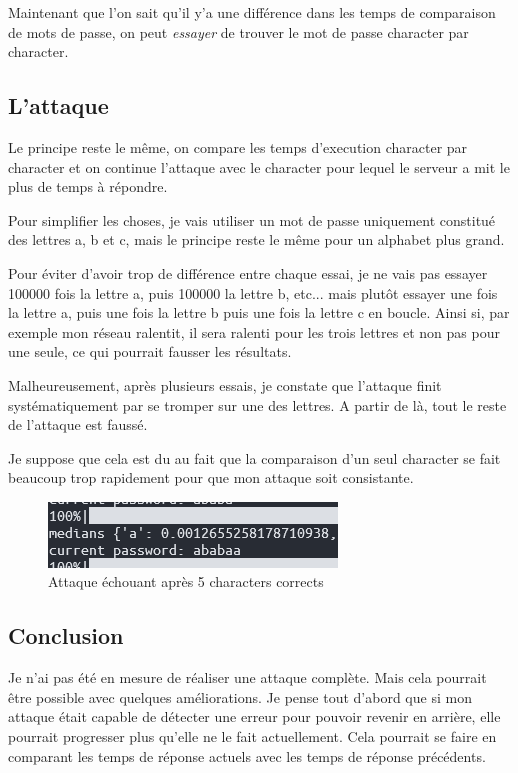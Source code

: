 \documentclass{article}
\begin{document}
Maintenant que l'on sait qu'il y'a une différence dans les temps de comparaison de mots de passe, on peut \emph{essayer} de trouver le mot de passe character par character.

\subsection*{L'attaque}

Le principe reste le même, on compare les temps d'execution character par character et on continue l'attaque avec le character pour lequel le serveur a mit le plus de temps à répondre.

Pour simplifier les choses, je vais utiliser un mot de passe uniquement constitué des lettres a, b et c, mais le principe reste le même pour un alphabet plus grand.

Pour éviter d'avoir trop de différence entre chaque essai, je ne vais pas essayer 100000 fois la lettre a, puis 100000 la lettre b, etc... mais plutôt essayer une fois la lettre a, puis une fois la lettre b puis une fois la lettre c en boucle. Ainsi si, par exemple mon réseau ralentit, il sera ralenti pour les trois lettres et non pas pour une seule, ce qui pourrait fausser les résultats.

Malheureusement, après plusieurs essais, je constate que l'attaque finit systématiquement par se tromper sur une des lettres. A partir de là, tout le reste de l'attaque est faussé.

Je suppose que cela est du au fait que la comparaison d'un seul character se fait beaucoup trop rapidement pour que mon attaque soit consistante.

\begin{figure}
    \caption{Attaque échouant après 5 characters corrects}
    \includegraphics{echec.png}
\end{figure}

\subsection*{Conclusion}

Je n'ai pas été en mesure de réaliser une attaque complète. Mais cela pourrait être possible avec quelques améliorations.
Je pense tout d'abord que si mon attaque était capable de détecter une erreur pour pouvoir revenir en arrière, elle pourrait progresser plus qu'elle ne le fait actuellement. Cela pourrait se faire en comparant les temps de réponse actuels avec les temps de réponse précédents.
\end{document}
